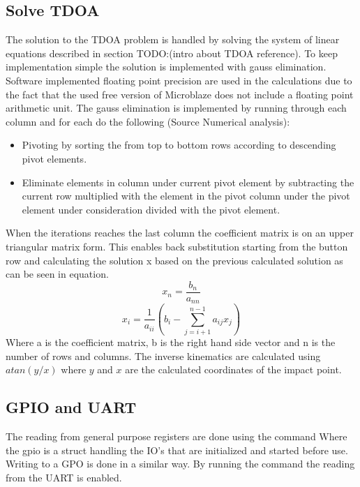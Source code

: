 \subsection{Solve TDOA}
The solution to the TDOA problem is handled by solving the system of linear equations described in section TODO:(intro about TDOA reference). To keep implementation simple the solution is implemented with gauss elimination. Software implemented floating point precision are used in the calculations due to the fact that the used free version of Microblaze does not include a floating point arithmetic unit. 
The gauss elimination is implemented by running through each column and for each do the following (Source Numerical analysis):
\begin{itemize}
	\item Pivoting by sorting the from top to bottom rows according to descending pivot elements.
	\item Eliminate elements in column under current pivot element by subtracting the current row multiplied with the element in the pivot column under the pivot element under consideration divided with the pivot element.
\end{itemize}
When the iterations reaches the last column the coefficient matrix is on an upper triangular matrix form. This enables back substitution starting from the button row and calculating the solution x based on the previous calculated solution as can be seen in equation.
\begin{equation}
	x_n = \frac{b_n}{a_{nn}}
\end{equation}
%
\begin{equation}
	x_i = \frac{1}{a_{ii}} (b_i - \sum_{j=i+1}^{n-1} a_{ij}x_j)
\end{equation}
Where a is the coefficient matrix, b is the right hand side vector and n is the number of rows and columns.
%
The inverse kinematics are calculated using $atan(y/x)$ where $y$ and $x$ are the calculated coordinates of the impact point. 
%
\subsection{GPIO and UART}
The reading from general purpose registers are done using the command
Where the gpio is a struct handling the IO's that are initialized and started before use.
Writing to a GPO is done in a similar way.
By running the command  the reading from the UART is enabled.

